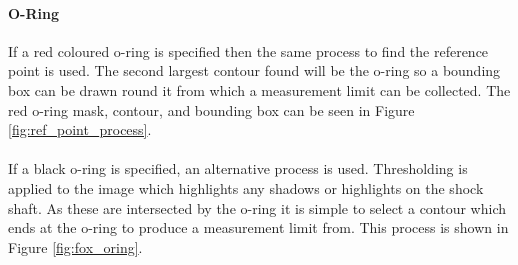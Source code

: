 		\paragraph{O-Ring}
			If a red coloured o-ring is specified then the same process to find the reference point is used. The second largest contour found will be the o-ring so a bounding box can be drawn round it from which a measurement limit can be collected. The red o-ring mask, contour, and bounding box can be seen in Figure \ref{fig:ref_point_process}.
			\\\\
			If a black o-ring is specified, an alternative process is used. Thresholding is applied to the image which highlights any shadows or highlights on the shock shaft. As these are intersected by the o-ring it is simple to select a contour which ends at the o-ring to produce a measurement limit from. This process is shown in Figure \ref{fig:fox_oring}.
